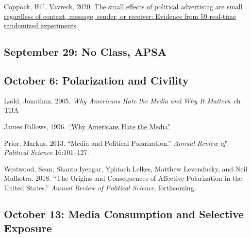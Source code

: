 \vspace{-.1in}\documentclass[11pt]{article}
\begin{document}
\noindent Coppock, Hill, Vavreck, 2020. \href{https://advances.sciencemag.org/content/6/36/eabc4046?intcmp=trendmd-adv}{The small effects of political advertising are small regardless of context, message, sender, or receiver: Evidence from 59 real-time randomized experiments}.
	



\subsection*{September 29: No Class, APSA}

\subsection*{October 6: Polarization and Civility}


Ladd, Jonathan. 2005. {\it Why Americans Hate the Media and Why It Matters}. ch TBA



\noindent James Fallows, 1996. \href{https://www.theatlantic.com/magazine/archive/1996/02/why-americans-hate-the-media/305060/}{``Why Americans Hate the Media"}


\noindent Prior, Markus. 2013. ``Media and Political Polarization.'' \emph{Annual Review of Political Science} 16:101--127.

\noindent Westwood, Sean, Shanto Iyengar, Yphtach Lelkes, Matthew Levendusky, and Neil Malhotra. 2018. ``The Origins and Consequences of Affective Polarization in the United States.'' \emph{Annual Review of Political Science}, forthcoming.










\subsection*{October 13: Media Consumption and Selective Exposure}
\end{document}
